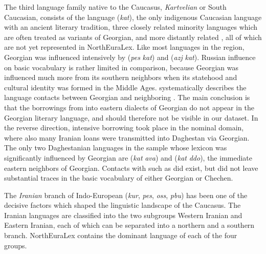 The third language family native to the Caucasus, \textit{Kartvelian} or South Caucasian, consists of the  language (\textit{kat}), the only indigenous Caucasian language with an ancient literary tradition, three closely related minority languages which are often treated as variants of Georgian, and more distantly related , all of which are not yet represented in NorthEuraLex. Like most languages in the region, Georgian was influenced intensively by  (\textit{pes} \arrowLA \textit{kat}) and  (\textit{azj} \arrowLA \textit{kat}). Russian influence on basic vocabulary is rather limited in comparison, because Georgian was influenced much more from its southern neighbors when its statehood and cultural identity was formed in the Middle Ages. \cite{khalilov1993} systematically describes the language contacts between Georgian and neighboring . The main conclusion
is that the borrowings from  into eastern dialects of Georgian do not appear in the Georgian literary language, and should therefore not be visible in our dataset. In the reverse direction, intensive borrowing took place in the nominal domain, where also many Iranian loans were transmitted into Daghestan via Georgian. The only two Daghestanian languages in the sample whose lexicon was significantly influenced by Georgian are  (\textit{kat} \arrowLA \textit{ava}) and  (\textit{kat} \arrowLA \textit{ddo}), the immediate eastern neighbors of Georgian. Contacts with  such as  did exist, but did not leave substantial traces in the basic vocabulary of either Georgian or Chechen.

The \textit{Iranian} branch of Indo-European (\textit{kur}, \textit{pes}, \textit{oss}, \textit{pbu}) has been one of the decisive factors which shaped the linguistic landscape of the Caucasus. The Iranian languages are classified into the two subgroups Western Iranian and Eastern Iranian, each of which can be separated into a northern and a southern branch. NorthEuraLex contains the dominant language of each of the four groups.


